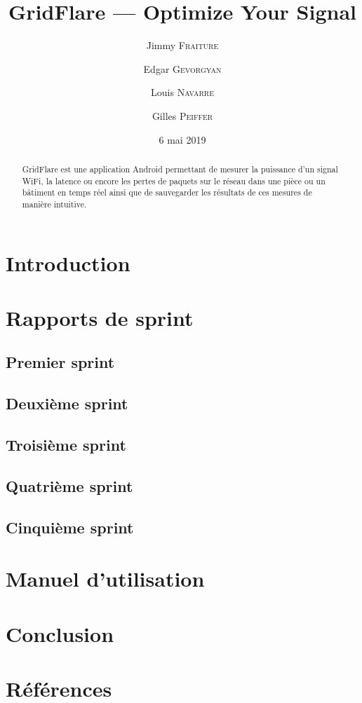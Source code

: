 \documentclass{elsarticle}
\begin{document}
\title{GridFlare --- Optimize Your Signal}
\date{6 mai 2019}

\address[add1]{École Polytechnique, Université catholique de Louvain, Place de l'Université 1, 1348 Ottignies-Louvain-la-Neuve, Belgique}

\author[add1]{Jimmy \textsc{Fraiture}}

\author[add1]{Edgar \textsc{Gevorgyan}}

\author[add1]{Louis \textsc{Navarre}}

\author[add1]{Gilles \textsc{Peiffer}}

\begin{abstract}
GridFlare est une application Android permettant de mesurer la puissance d'un signal WiFi, la latence ou encore les pertes de paquets sur le réseau dans une pièce ou un bâtiment en temps réel ainsi que de sauvegarder les résultats de ces mesures de manière intuitive.
\end{abstract}
\maketitle

\section{Introduction}
\section{Rapports de sprint}
\subsection{Premier sprint}
\subsection{Deuxième sprint}
\subsection{Troisième sprint}
\subsection{Quatrième sprint}
\subsection{Cinquième sprint}
\section{Manuel d'utilisation}
\section{Conclusion}

\section*{Références}


\end{document}
